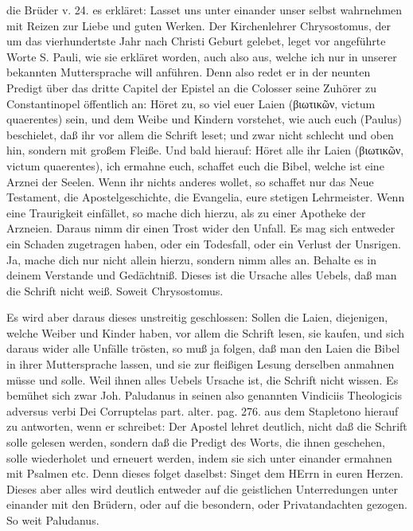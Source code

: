 die Brüder v. 24. es erkläret: Lasset uns unter einander unser selbst wahrnehmen mit Reizen zur Liebe und guten Werken. Der Kirchenlehrer Chrysostomus, der um das vierhundertste Jahr nach Christi Geburt gelebet, leget vor angeführte Worte S. Pauli, wie sie erkläret worden, auch also aus, welche ich nur in unserer bekannten Muttersprache will anführen. Denn also redet er in der neunten Predigt über das dritte Capitel der Epistel an die Colosser seine Zuhörer zu Constantinopel öffentlich an: Höret zu, so viel euer Laien (βιωτικῶν, victum quaerentes) sein, und dem Weibe und Kindern vorstehet, wie auch euch (Paulus) beschielet, daß ihr vor allem die Schrift leset; und zwar nicht schlecht und oben hin, sondern mit großem Fleiße. Und bald hierauf: Höret alle ihr Laien (βιωτικῶν, victum quaerentes), ich ermahne euch, schaffet euch die Bibel, welche ist eine Arznei der Seelen. Wenn ihr nichts anderes wollet, so schaffet nur das Neue Testament, die Apostelgeschichte, die Evangelia, eure stetigen Lehrmeister. Wenn eine Traurigkeit einfället, so mache dich hierzu, als zu einer Apotheke der Arzneien. Daraus nimm dir einen Trost wider den Unfall. Es mag sich entweder ein Schaden zugetragen haben, oder ein Todesfall, oder ein Verlust der Unsrigen. Ja, mache dich nur nicht allein hierzu, sondern nimm alles an. Behalte es in deinem Verstande und Gedächtniß. Dieses ist die Ursache alles Uebels, daß man die Schrift nicht weiß. Soweit Chrysostomus.

Es wird aber daraus dieses unstreitig geschlossen: Sollen die Laien, diejenigen, welche Weiber und Kinder haben, vor allem die Schrift lesen, sie kaufen, und sich daraus wider alle Unfälle trösten, so muß ja folgen, daß man den Laien die Bibel in ihrer Muttersprache lassen, und sie zur fleißigen Lesung derselben anmahnen müsse und solle. Weil ihnen alles Uebels Ursache ist, die Schrift nicht wissen. Es bemühet sich zwar Joh. Paludanus in seinen also genannten Vindiciis Theologicis adversus verbi Dei Corruptelas part. alter. pag. 276. aus dem Stapletono hierauf zu antworten, wenn er schreibet: Der Apostel lehret deutlich, nicht daß die Schrift solle gelesen werden, sondern daß die Predigt des Worts, die ihnen geschehen, solle wiederholet und erneuert werden, indem sie sich unter einander ermahnen mit Psalmen etc. Denn dieses folget daselbst: Singet dem HErrn in euren Herzen. Dieses aber alles wird deutlich entweder auf die geistlichen Unterredungen unter einander mit den Brüdern, oder auf die besondern, oder Privatandachten gezogen. So weit Paludanus.

